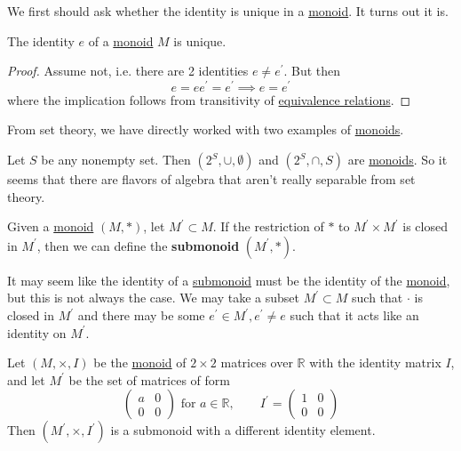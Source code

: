   We first should ask whether the identity is unique in a \hyperref[def:monoid]{monoid}. It turns out it is. 

  \begin{lemma}
    \label{thm:uniqueness-of-monoid-identity}
    The identity $e$ of a \hyperref[def:monoid]{monoid} $M$ is unique. 
  \end{lemma}
  \begin{proof}
    Assume not, i.e. there are 2 identities $e \neq e^\prime$. But then 
    \begin{equation}
      e = e e^\prime = e^\prime \implies e = e^\prime
    \end{equation}
    where the implication follows from transitivity of \hyperref[st-def:equivalence_relation]{equivalence relations}. 
  \end{proof} 

  From set theory, we have directly worked with two examples of \hyperref[def:monoid]{monoids}. 

  \begin{example}
    \label{ex:set-operations}
    Let $S$ be any nonempty set. Then $(2^S, \cup, \emptyset)$ and $(2^S, \cap, S)$ are \hyperref[def:monoid]{monoids}. So it seems that there are flavors of algebra that aren't really separable from set theory. 
  \end{example}

  \begin{definition}[Submonoid]
    \label{def:submonoid}
    Given a \hyperref[def:monoid]{monoid} $(M, \ast)$, let $M^\prime \subset M$. If the restriction of $\ast$ to $M^\prime \times M^\prime$ is closed in $M^\prime$, then we can define the \textbf{submonoid} $(M^\prime, \ast)$. 
  \end{definition} 

  It may seem like the identity of a \hyperref[def:submonoid]{submonoid} must be the identity of the \hyperref[def:monoid]{monoid}, but this is not always the case. We may take a subset $M^\prime \subset M$ such that $\cdot$ is closed in $M^\prime$ and there may be some $e^\prime \in M^\prime, e^\prime \neq e$ such that it acts like an identity on $M^\prime$. 

  \begin{example}
    \label{ex:identities-of-submonoids-may-not-be-the-same}
    Let $(M, \times, I)$ be the \hyperref[def:monoid]{monoid} of $2 \times 2$ matrices over $\mathbb{R}$ with the identity matrix $I$, and let $M^\prime$ be the set of matrices of form 
    \begin{equation}
      \begin{pmatrix} a & 0 \\ 0 & 0 \end{pmatrix} \text{ for } a \in \mathbb{R}, \qquad I^\prime = \begin{pmatrix} 1 & 0 \\ 0 & 0 \end{pmatrix}
    \end{equation}
    Then $(M^\prime, \times, I^\prime)$ is a submonoid with a different identity element. 
  \end{example}


